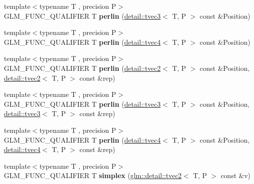 \begin{DoxyCompactItemize}
\item 
\hypertarget{namespaceglm_a11707c4e77f153abec905731b1ce52a0}{{\footnotesize template$<$typename T , precision P$>$ }\\G\-L\-M\-\_\-\-F\-U\-N\-C\-\_\-\-Q\-U\-A\-L\-I\-F\-I\-E\-R T {\bfseries perlin} (\hyperlink{structglm_1_1detail_1_1tvec3}{detail\-::tvec3}$<$ T, P $>$ const \&Position)}\label{namespaceglm_a11707c4e77f153abec905731b1ce52a0}

\item 
\hypertarget{namespaceglm_ac5aa8a72ead80436e891284db02a2f20}{{\footnotesize template$<$typename T , precision P$>$ }\\G\-L\-M\-\_\-\-F\-U\-N\-C\-\_\-\-Q\-U\-A\-L\-I\-F\-I\-E\-R T {\bfseries perlin} (\hyperlink{structglm_1_1detail_1_1tvec4}{detail\-::tvec4}$<$ T, P $>$ const \&Position)}\label{namespaceglm_ac5aa8a72ead80436e891284db02a2f20}

\item 
\hypertarget{namespaceglm_aa7529608f67b6200929a30cc5e3f5c71}{{\footnotesize template$<$typename T , precision P$>$ }\\G\-L\-M\-\_\-\-F\-U\-N\-C\-\_\-\-Q\-U\-A\-L\-I\-F\-I\-E\-R T {\bfseries perlin} (\hyperlink{structglm_1_1detail_1_1tvec2}{detail\-::tvec2}$<$ T, P $>$ const \&Position, \hyperlink{structglm_1_1detail_1_1tvec2}{detail\-::tvec2}$<$ T, P $>$ const \&rep)}\label{namespaceglm_aa7529608f67b6200929a30cc5e3f5c71}

\item 
\hypertarget{namespaceglm_adc2ed67b3bf55ef9fcf95dae1b980148}{{\footnotesize template$<$typename T , precision P$>$ }\\G\-L\-M\-\_\-\-F\-U\-N\-C\-\_\-\-Q\-U\-A\-L\-I\-F\-I\-E\-R T {\bfseries perlin} (\hyperlink{structglm_1_1detail_1_1tvec3}{detail\-::tvec3}$<$ T, P $>$ const \&Position, \hyperlink{structglm_1_1detail_1_1tvec3}{detail\-::tvec3}$<$ T, P $>$ const \&rep)}\label{namespaceglm_adc2ed67b3bf55ef9fcf95dae1b980148}

\item 
\hypertarget{namespaceglm_aae37c0aec171d76dc3ca061fe4ee8a9c}{{\footnotesize template$<$typename T , precision P$>$ }\\G\-L\-M\-\_\-\-F\-U\-N\-C\-\_\-\-Q\-U\-A\-L\-I\-F\-I\-E\-R T {\bfseries perlin} (\hyperlink{structglm_1_1detail_1_1tvec4}{detail\-::tvec4}$<$ T, P $>$ const \&Position, \hyperlink{structglm_1_1detail_1_1tvec4}{detail\-::tvec4}$<$ T, P $>$ const \&rep)}\label{namespaceglm_aae37c0aec171d76dc3ca061fe4ee8a9c}

\item 
\hypertarget{namespaceglm_abdfacc8dd98029ebf09c0a4a1ed505f5}{{\footnotesize template$<$typename T , precision P$>$ }\\G\-L\-M\-\_\-\-F\-U\-N\-C\-\_\-\-Q\-U\-A\-L\-I\-F\-I\-E\-R T {\bfseries simplex} (\hyperlink{structglm_1_1detail_1_1tvec2}{glm\-::detail\-::tvec2}$<$ T, P $>$ const \&v)}\label{namespaceglm_abdfacc8dd98029ebf09c0a4a1ed505f5}


\end{DoxyCompactItemize}

